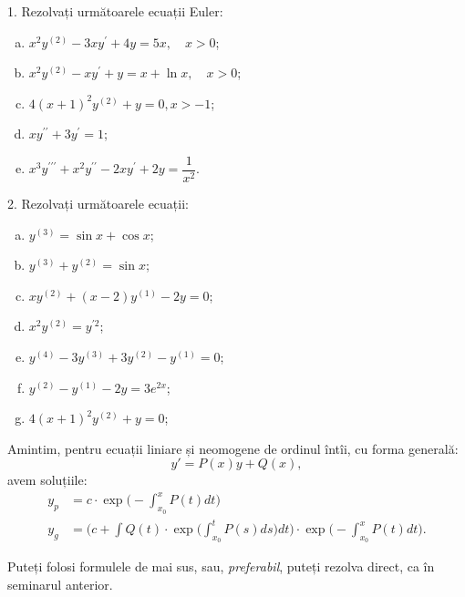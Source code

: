 1. Rezolvați următoarele ecuații Euler:
\begin{enumerate}[(a)]
\item $ x^2 y^{(2)} - 3xy^{\prime} + 4y = 5x, \quad x > 0 $;
\item $ x^2 y^{(2)} - xy^{\prime} + y = x + \ln x, \quad x > 0 $;
\item $ 4(x + 1)^2 y^{(2)} + y = 0, x > -1 $;
\item $ xy^{\prime\prime} + 3y^{\prime} = 1 $;
\item $ x^3 y^{\prime\prime\prime} + x^2y^{\prime\prime} - 2xy^{\prime} + 2y = \dfrac{1}{x^2} $.
\end{enumerate}


\vspace{1cm}

2. Rezolvați următoarele ecuații:
\begin{enumerate}[(a)]
\item $ y^{(3)} = \sin x + \cos x $;
\item $ y^{(3)} + y^{(2)} = \sin x $;
\item $ xy^{(2)} + (x - 2)y^{(1)} - 2y = 0 $;
\item $ x^2 y^{(2)} = y^{\prime 2} $;
\item $ y^{(4)} - 3y^{(3)} + 3y^{(2)} - y^{(1)} = 0 $;
\item $ y^{(2)} - y^{(1)} - 2y = 3e^{2x} $;
\item $ 4(x + 1)^2 y^{(2)} + y = 0 $;
\end{enumerate}

Amintim, pentru ecuații liniare și neomogene de ordinul întîi, cu forma generală:
\[
  y' = P(x) y + Q(x),
\]
avem soluțiile:
\begin{align*}
  y_p &= c \cdot \exp\Big( - \int_{x_0}^x P(t) dt \Big) \\
  y_g &= \Big( c + \int Q(t) \cdot \exp \Big( \int_{x_0}^t P(s) ds \Big) dt \Big) \cdot \exp \Big(- \int_{x_0}^x P(t) dt \Big).
\end{align*}

Puteți folosi formulele de mai sus, sau, \emph{preferabil}, puteți rezolva direct,
ca în seminarul anterior.

